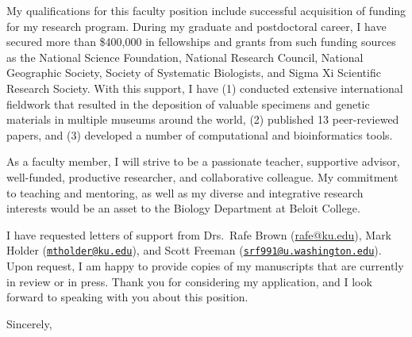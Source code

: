\documentclass[letterpaper, 10pt]{letter}
\begin{document}
\begin{letter}

My qualifications for this faculty position include successful acquisition
of funding for my research program.
During my graduate and postdoctoral career, I have secured more than
\$400,000 in fellowships and grants from such funding sources as the 
National Science Foundation,
National Research Council,
National Geographic Society,
Society of Systematic Biologists, and
Sigma Xi Scientific Research Society.
With this support, I have
(1) conducted extensive international fieldwork that resulted in
the deposition of valuable specimens and genetic materials in multiple
museums around the world,
(2) published 13 peer-reviewed papers, and
(3) developed a number of computational and bioinformatics tools.



As a faculty member, I will strive to be a passionate teacher, supportive
advisor, well-funded, productive researcher, and collaborative colleague.
My commitment to teaching and mentoring, as well as my diverse and integrative
research interests would be an asset to the Biology Department at Beloit
College.

I have requested letters of support from Drs.\
Rafe Brown
(\href{mailto:rafe@ku.edu}{rafe@ku.edu}),
Mark Holder
(\href{mailto:mtholder@ku.edu}{\tt mtholder@ku.edu}),
and
Scott Freeman
(\href{mailto:srf991@u.washington.edu}{\tt srf991@u.washington.edu}).
Upon request, I am happy to provide copies of my manuscripts that are currently
in review or in press.
Thank you for considering my application, and I look forward to speaking with
you about this position.

\addtolength{\medskipamount}{-5pt}
\closing{Sincerely,}
\end{letter}
\end{document}
